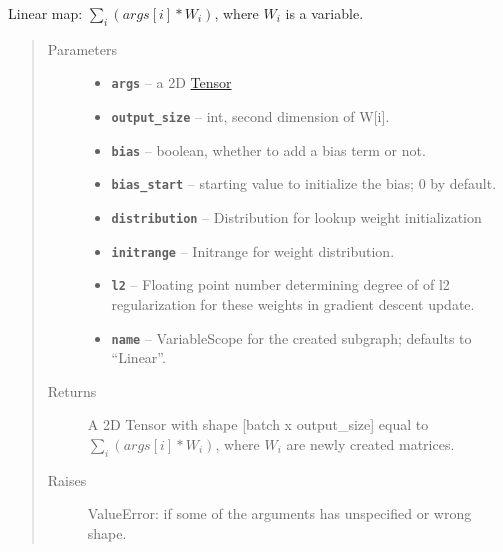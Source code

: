\documentclass[letterpaper,10pt,english]{sphinxmanual}
\begin{document}
\begin{fulllineitems}
\label{node_ops:node_ops.linear}
Linear map: \(\sum_i(args[i] * W_i)\), where \(W_i\) is a variable.
\begin{quote}\begin{description}
\item[{Parameters}] \leavevmode\begin{itemize}
\item {} 
\textbf{\texttt{args}} -- a 2D \href{https://www.tensorflow.org/versions/r0.7/api\_docs/python/framework.html\#Tensor}{Tensor}

\item {} 
\textbf{\texttt{output\_size}} -- int, second dimension of W{[}i{]}.

\item {} 
\textbf{\texttt{bias}} -- boolean, whether to add a bias term or not.

\item {} 
\textbf{\texttt{bias\_start}} -- starting value to initialize the bias; 0 by default.

\item {} 
\textbf{\texttt{distribution}} -- Distribution for lookup weight initialization

\item {} 
\textbf{\texttt{initrange}} -- Initrange for weight distribution.

\item {} 
\textbf{\texttt{l2}} -- Floating point number determining degree of of l2 regularization for these weights in gradient descent update.

\item {} 
\textbf{\texttt{name}} -- VariableScope for the created subgraph; defaults to ``Linear''.

\end{itemize}

\item[{Returns}] \leavevmode
A 2D Tensor with shape {[}batch x output\_size{]} equal to
\(\sum_i(args[i] * W_i)\), where \(W_i\) are newly created matrices.

\item[{Raises}] \leavevmode
ValueError: if some of the arguments has unspecified or wrong shape.

\end{description}\end{quote}

\end{fulllineitems}
\end{document}
